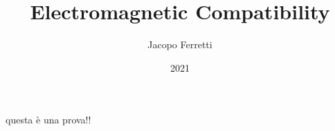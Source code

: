 \documentclass{article}
\title{Electromagnetic Compatibility}
\date{2021}
\author{Jacopo Ferretti}
\numberwithin{equation}{section}
\begin{document}
\maketitle
\newpage
\tableofcontents
\newpage
questa è una prova!!


\end{document}
